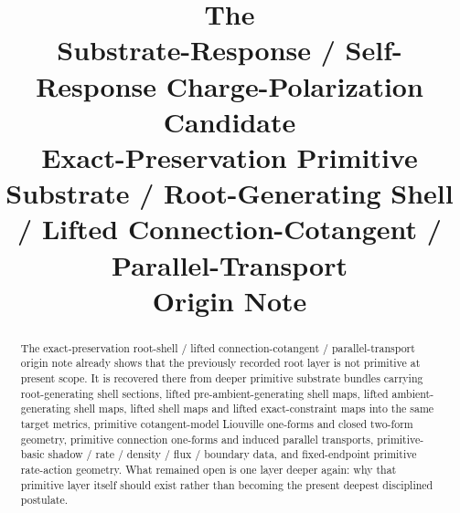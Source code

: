 \documentclass[11pt]{article}
\title{\textbf{The \TheoryName{}}\\[0.4em]
\large Substrate-Response / Self-Response Charge-Polarization Candidate\\
\large Exact-Preservation Primitive Substrate / Root-Generating Shell / Lifted Connection-Cotangent / Parallel-Transport\\
\large Origin Note}
\author{}
\date{}
\begin{document}
\maketitle

\begin{abstract}
The exact-preservation root-shell / lifted connection-cotangent / parallel-transport origin note already shows that the previously recorded root layer is not primitive at present scope. It is recovered there from deeper primitive substrate bundles carrying root-generating shell sections, lifted pre-ambient-generating shell maps, lifted ambient-generating shell maps, lifted shell maps and lifted exact-constraint maps into the same target metrics, primitive cotangent-model Liouville one-forms and closed two-form geometry, primitive connection one-forms and induced parallel transports, primitive-basic shadow / rate / density / flux / boundary data, and fixed-endpoint primitive rate-action geometry. What remained open is one layer deeper again: why that primitive layer itself should exist rather than becoming the present deepest disciplined postulate.


\end{abstract}
\end{document}
